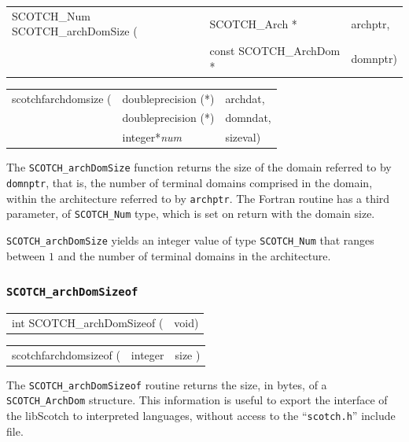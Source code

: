 \begin{itemize}
\progsyn

{\tt\begin{tabular}{l@{}ll}
SCOTCH\_Num SCOTCH\_archDomSize ( & SCOTCH\_Arch *          & archptr, \\
                                  & const SCOTCH\_ArchDom * & domnptr) \\
\end{tabular}}

{\tt\begin{tabular}{l@{}ll}
scotchfarchdomsize ( & doubleprecision (*) & archdat, \\
                     & doubleprecision (*) & domndat, \\
                     & integer*{\it num}   & sizeval)
\end{tabular}}

\progdes
The {\tt SCOTCH\_archDomSize} function returns the size of the domain
referred to by {\tt domnptr}, that is, the number of terminal domains
comprised in the domain, within the architecture referred to by
{\tt archptr}.
The Fortran routine has a third parameter, of {\tt SCOTCH\_\lbt Num}
type, which is set on return with the domain size.

\progret

{\tt SCOTCH\_archDomSize} yields an integer value of type
{\tt SCOTCH\_\lbt Num} that ranges between $1$ and the number of
terminal domains in the architecture.
\end{itemize}

\subsubsection{{\tt SCOTCH\_archDomSizeof}}

\begin{itemize}
\progsyn

{\tt\begin{tabular}{l@{}l}
int SCOTCH\_archDomSizeof ( & void)
\end{tabular}}

{\tt\begin{tabular}{l@{}ll}
scotchfarchdomsizeof ( & integer & size )
\end{tabular}}

\progdes

The {\tt SCOTCH\_archDomSizeof} routine returns the size, in bytes, of
a {\tt SCOTCH\_\lbt ArchDom} structure. This information is useful to
export the interface of the {\sc libScotch} to interpreted languages,
without access to the ``{\tt scotch.h}'' include file.
\end{itemize}

